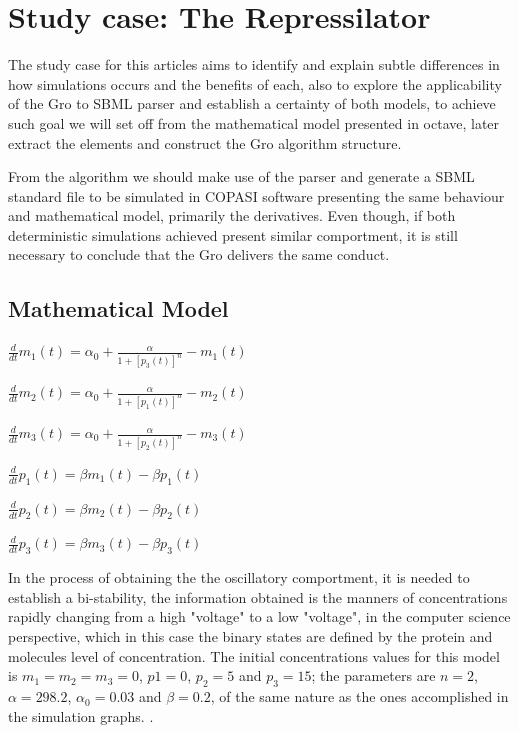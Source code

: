 \documentclass[12pt]{article}
\begin{document}
\section{Study case: The Repressilator}

The study case for this articles aims to identify and explain subtle differences in how simulations occurs and the benefits of each, also to explore the applicability of the Gro to SBML parser and establish a certainty of both models, to achieve such goal we will set off from the mathematical model presented in octave, later extract the elements and construct the Gro algorithm structure. 

From the algorithm we should make use of the parser and generate a SBML standard file to be simulated in COPASI software presenting the same behaviour and mathematical model, primarily the derivatives. Even though, if both deterministic simulations achieved present similar comportment, it is still necessary to conclude that the Gro delivers the same conduct.

\subsection{Mathematical Model}



$\frac{d}{dt}m_{1}(t) = \alpha_{0} + \frac{\alpha}{1 + [p_{3}(t)]^{n}} - m_{1}(t)$

$\frac{d}{dt}m_{2}(t) = \alpha_{0} + \frac{\alpha}{1 + [p_{1}(t)]^{n}} - m_{2}(t)$

$\frac{d}{dt}m_{3}(t) = \alpha_{0} + \frac{\alpha}{1 + [p_{2}(t)]^{n}} - m_{3}(t)$

$\frac{d}{dt}p_{1}(t) = \beta{m_{1}}(t) - \beta{p_{1}}(t)$

$\frac{d}{dt}p_{2}(t) = \beta{m_{2}}(t) - \beta{p_{2}}(t)$

$\frac{d}{dt}p_{3}(t) = \beta{m_{3}}(t) - \beta{p_{3}}(t)$ 

In the process of obtaining the the oscillatory comportment, it is needed to establish a bi-stability, the information obtained is the manners of concentrations rapidly changing from a high "voltage" to a low "voltage", in the computer science perspective, which in this case the binary states are defined by the protein and molecules level of concentration. The initial concentrations values for this model is $m_{1} = m_{2} = m_{3} = 0$, $p1 = 0$, $p_{2} = 5$ and $p_{3} = 15$; the parameters are $n = 2$, $\alpha = 298.2$, $\alpha_{0} = 0.03$ and $\beta = 0.2$, of the same nature as the ones accomplished in the simulation graphs. \cite{ingalls2013mathematical}.
\end{document}
